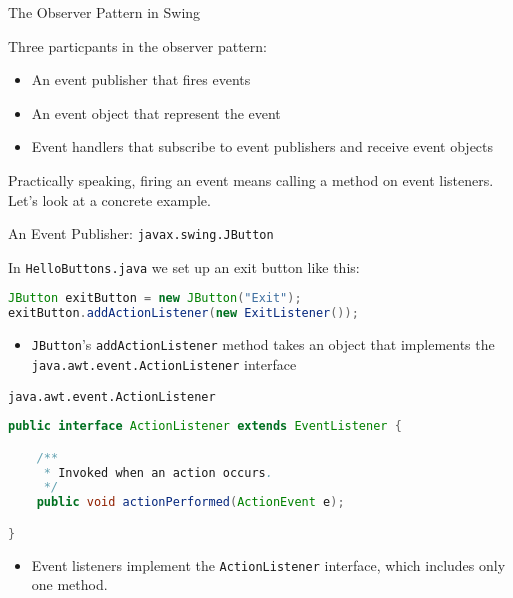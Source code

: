 \documentclass{beamer}
\begin{document}
\begin{frame}[fragile]{The Observer Pattern in Swing}


Three particpants in the observer pattern:
\begin{itemize}
\item An event publisher that fires events
\item An event object that represent the event
\item Event handlers that subscribe to event publishers and receive event objects
\end{itemize}

Practically speaking, firing an event means calling a method on event listeners.  Let's look at a concrete example.




\end{frame}

\begin{frame}[fragile]{An Event Publisher: {\tt javax.swing.JButton}}


In {\tt HelloButtons.java} we set up an exit button like this:
\begin{lstlisting}[language=Java]
JButton exitButton = new JButton("Exit");
exitButton.addActionListener(new ExitListener());
\end{lstlisting}

\begin{itemize}
\item {\tt JButton}'s {\tt addActionListener} method takes an object that implements the {\tt java.awt.event.ActionListener} interface
\end{itemize}


\end{frame}

\begin{frame}[fragile]{{\tt java.awt.event.ActionListener}}


\begin{lstlisting}[language=Java]
public interface ActionListener extends EventListener {

    /**
     * Invoked when an action occurs.
     */
    public void actionPerformed(ActionEvent e);

}
\end{lstlisting}

\begin{itemize}
\item Event listeners implement the {\tt ActionListener} interface, which includes only one method.
\end{itemize}


\end{frame}
\end{document}
